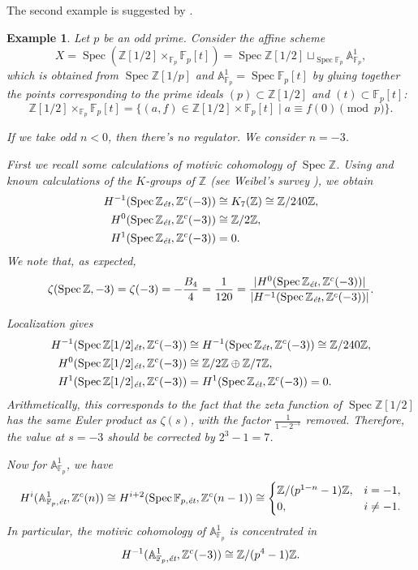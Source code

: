 \documentclass[draft]{article}
\DeclareMathOperator{\Spec}{Spec}
\newcommand{\FF}{\mathbb{F}}
\newcommand{\ZZ}{\mathbb{Z}}
\renewcommand{\AA}{\mathbb{A}}
\newcommand{\et}{\text{\it \'{e}t}}
\theoremstyle{myplain}
\theoremstyle{mydefinition}
\newtheorem{example}[theorem]{Example}
\numberwithin{equation}{section}
\begin{document}
The second example is suggested by \cite[\S 7]{Jordan-Poonen-2020}.

\begin{example}
  Let $p$ be an odd prime. Consider the affine scheme
  \[ X = \Spec (\ZZ [1/2] \times_{\FF_p} \FF_p [t]) =
    \Spec \ZZ [1/2] \mathop{\sqcup}_{\Spec \FF_p} \AA^1_{\FF_p}, \]
  which is obtained from $\Spec \ZZ [1/p]$ and $\AA^1_{\FF_p} = \Spec \FF_p [t]$ by
  gluing together the points corresponding to the prime ideals
  $(p) \subset \ZZ [1/2]$ and $(t) \subset \FF_p [t]$:
  \[ \ZZ [1/2] \times_{\FF_p} \FF_p [t] =
    \{ (a,f) \in \ZZ [1/2] \times \FF_p [t] \mid a \equiv f (0) \pmod{p} \}. \]

  If we take odd $n < 0$, then there's no regulator. We consider $n = -3$.

  First we recall some calculations of motivic cohomology of $\Spec \ZZ$.  Using
  \cite[Proposition~2.1]{Kolster-Sands-2008} and known calculations of
  the $K$-groups of $\ZZ$ (see Weibel's survey \cite{Weibel-2005}), we obtain
  \begin{align*}
    H^{-1} (\Spec \ZZ_\et, \ZZ^c (-3)) & \cong K_7 (\ZZ) \cong \ZZ/240\ZZ, \\
    H^0 (\Spec \ZZ_\et, \ZZ^c (-3)) & \cong \ZZ/2\ZZ, \\
    H^1 (\Spec \ZZ_\et, \ZZ^c (-3)) & = 0.
  \end{align*}
  We note that, as expected,
  \[ \zeta (\Spec \ZZ, -3) = \zeta (-3) = -\frac{B_4}{4} = \frac{1}{120} =
    \frac{|H^0 (\Spec \ZZ_\et, \ZZ^c (-3))|}{|H^{-1} (\Spec \ZZ_\et, \ZZ^c (-3))|}. \]

  Localization gives
  \begin{align*}
    H^{-1} (\Spec \ZZ [1/2]_\et, \ZZ^c (-3)) & \cong H^{-1} (\Spec \ZZ_\et, \ZZ^c (-3)) \cong \ZZ/240\ZZ, \\
    H^0 (\Spec \ZZ [1/2]_\et, \ZZ^c (-3)) & \cong \ZZ/2\ZZ \oplus \ZZ/7\ZZ, \\
    H^1 (\Spec \ZZ [1/2]_\et, \ZZ^c (-3)) & = H^1 (\Spec \ZZ_\et, \ZZ^c (-3)) = 0.
  \end{align*}
  Arithmetically, this corresponds to the fact that the zeta function of
  $\Spec \ZZ [1/2]$ has the same Euler product as $\zeta (s)$, with the factor
  $\frac{1}{1-2^{-s}}$ removed. Therefore, the value at $s = -3$ should be
  corrected by $2^3 - 1 = 7$.

  Now for $\AA^1_{\FF_p}$, we have
  \[ H^i (\AA^1_{\FF_p, \et}, \ZZ^c (n)) \cong
    H^{i+2} (\Spec \FF_{p,\et}, \ZZ^c (n-1)) \cong
    \begin{cases}
      \ZZ/(p^{1-n} - 1)\ZZ, & i = -1, \\
      0, & i \ne -1.
    \end{cases} \]
  In particular, the motivic cohomology of $\AA^1_{\FF_p}$ is concentrated in
  \[ H^{-1} (\AA^1_{\FF_p, \et}, \ZZ^c (-3)) \cong \ZZ/(p^4-1)\ZZ. \]


\end{example}
\end{document}
